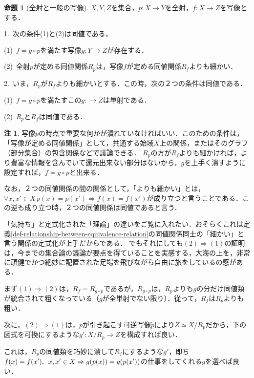 \documentclass[uplatex, 12pt, dvipdfmx]{jsreport}
\theoremstyle{definition}
\newtheorem{proposition}[theorem]{命題}
\newtheorem{remark}[theorem]{注}
\theoremstyle{StatementsWithStar}
\theoremstyle{StatementsWithStar2}
\theoremstyle{StatementsWithStar3}
\theoremstyle{StatementsWithCCirc}
\theoremstyle{definition}
\begin{document}
\begin{proposition}[全射と一般の写像]\label{prop-induced-mapping}\rm{}
    $X,Y,Z$を集合，$p:X\to Y$を全射，$f:X\to Z$を写像とする．

    1.\, 次の条件(1)と(2)は同値である，

    (1)\, $f=g\circ p$を満たす写像$g:Y\to Z$が存在する．
    \begin{center}\end{center}

    (2)\, 全射$p$が定める同値関係$R_p$は，写像$f$が定める同値関係$R_f$よりも細かい．

    2.\, いま，$R_p$が$R_f$よりも細かいとする．この時，次の２つの条件は同値である．

    (1)\, $f=g\circ p$を満たすこの$g:\to Z$は単射である．

    (2)\, $R_p$と$R_f$は同値である．
\end{proposition}
\begin{remark}
    写像$p$の時点で重要な何かが潰れていなければいい．このための条件は，「写像が定める同値関係」として，共通する始域$X$上の関係，またはそのグラフ（部分集合）の包含関係などで議論できる．
    $R_p$の方が$R_f$よりも細かければ，より豊富な情報を含んでいて還元出来ない部分はないから，$g$を上手く潰すように設定すれば，$f=g\circ p$と出来る．

    なお，２つの同値関係の間の関係として，「よりも細かい」とは，$\forall x,x'\in X \, p(x)=p(x')\Rightarrow f(x)=f(x')$が成り立つと言うことである．この逆も成り立つ時，２つの同値関係は同値であると言う．
\end{remark}
「気持ち」と定式化された「理論」の違いをご覧に入れたい．おそらくこれは定義\ref{def-relationship-between-equivalence-relation}の同値関係同士の「細かい」と言う関係の定式化が上手だからである．
でもそれにしても$(2)\Rightarrow (1)$の証明は，今までの集合論の議論が要点を得ていることを実感する，大海の上を，非常に頑健でかつ絶妙に配置された足場を飛びながら自由に旅をしているの感がある．

まず$(1)\Rightarrow (2)$は，$R_f=R_{g\circ p}$であるが，$R_{g\circ p}$は，$R_p$よりも$g$の分だけ同値類が統合されて粗くなっている（$g$が全単射でない限り）．従って，$R_f$は$R_p$よりも粗い．

次に，$(2)\Rightarrow (1)$は，$p$が引き起こす可逆写像$\tilde{p}$により$Z\simeq X/R_p$だから，下の図式を可換にするような$g':X/R_p\to Z$を構成すれば良い．
\begin{center}\end{center}
これは，$R_p$の同値類を巧妙に潰して$R_f$にするような$g'$，即ち$f(x)=f(x'),\hspace{0.5em} x,x'\in X \Rightarrow g(p(x))=g(p(x'))$の仕事をしてくれる$g$を選べば良い．
\end{document}
